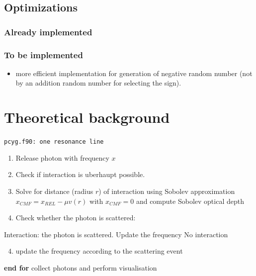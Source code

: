 \documentclass[../main/main.tex]{subfiles}
\begin{document}
\newpage
\subsection{Optimizations}

\subsubsection{Already implemented}

\subsubsection{To be implemented}

\begin{itemize}
\item more efficient implementation for generation of negative random number (not by an addition random number for selecting the sign).
\end{itemize}

\newpage
\section{Theoretical background}

\begin{center}
\vspace{-0.45cm}
\begin{algorithm}[!htp]
\caption{\texttt{pcyg.f90: one resonance line}}
\label{pcyg_one_line}
\begin{algorithmic}

\begin{enumerate}
\item Release photon with frequency $x$
\item Check if interaction is uberhaupt possible.
\item Solve for distance (radius $r$) of interaction using Sobolev approximation $x_{CMF} = x_{REL} - \mu v(r)$ with $\boxed{x_{CMF} = 0}$ and compute Sobolev optical depth
\item Check whether the photon is scattered:
\end{enumerate}
\State Interaction: the photon is scattered. Update the frequency
\Else \State No interaction
\EndIf

\begin{enumerate}
\setcounter{enumi}{3}
\item update the frequency according to the scattering event
\end{enumerate}
	
\EndFor
\State \textbf{end for}
\State collect photons and perform visualisation

\end{algorithmic}
\end{algorithm}
\end{center}
\end{document}
